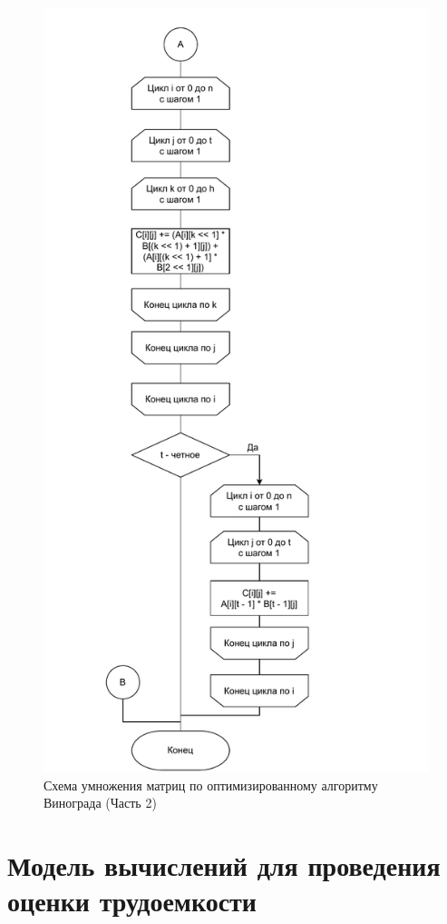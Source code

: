 \begin{figure}[h]
	\centering
	\includegraphics[width=0.7\linewidth]{img/vinograd_opt_alg_2.pdf}
	\caption{Схема умножения матриц по оптимизированному алгоритму Винограда (Часть 2)}
	\label{img:vinograd_opt_alg_2}
\end{figure}
\clearpage

\section{Модель вычислений для проведения оценки трудоемкости}

